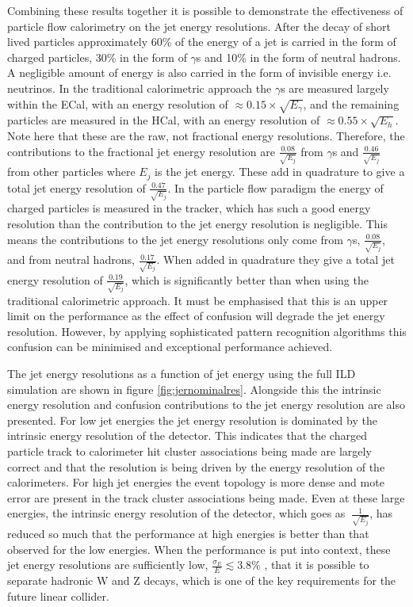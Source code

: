 Combining these results together it is possible to demonstrate the effectiveness of particle flow calorimetry on the jet energy resolutions.  After the decay of short lived particles approximately 60\% of the energy of a jet is carried in the form of charged particles, 30\% in the form of $\gamma$s and 10\% in the form of neutral hadrons.  A negligible amount of energy is also carried in the form of invisible energy i.e. neutrinos.  In the traditional calorimetric approach the $\gamma$s are measured largely within the ECal, with an energy resolution of $\approx 0.15 \times \sqrt{E_{\gamma}}$, and the remaining particles are measured in the HCal, with an energy resolution of $\approx 0.55 \times \sqrt{E_{h}}$.  Note here that these are the raw, not fractional energy resolutions.  Therefore, the contributions to the fractional jet energy resolution are $\frac{0.08}{\sqrt{E_{j}}}$ from $\gamma$s and $\frac{0.46}{\sqrt{E_{j}}}$ from other particles where $E_{j}$ is the jet energy.  These add in quadrature to give a total jet energy resolution of $\frac{0.47}{\sqrt{E_{j}}}$.  In the particle flow paradigm the energy of charged particles is measured in the tracker, which has such a good energy resolution than the contribution to the jet energy resolution is negligible.  This means the contributions to the jet energy resolutions only come from $\gamma$s, $\frac{0.08}{\sqrt{E_{j}}}$, and from neutral hadrons, $\frac{0.17}{\sqrt{E_{j}}}$.  When added in quadrature they give a total jet energy resolution of $\frac{0.19}{\sqrt{E_{j}}}$, which is significantly better than when using the traditional calorimetric approach.  It must be emphasised that this is an upper limit on the performance as the effect of confusion will degrade the jet energy resolution.  However, by applying sophisticated pattern recognition algorithms this confusion can be minimised and exceptional performance achieved. 

The jet energy resolutions as a function of jet energy using the full ILD simulation are shown in figure \ref{fig:jernominalres}.  Alongside this the intrinsic energy resolution and confusion contributions to the jet energy resolution are also presented.  For low jet energies the jet energy resolution is dominated by the intrinsic energy resolution of the detector.  This indicates that the charged particle track to calorimeter hit cluster associations being made are largely correct and that the resolution is being driven by the energy resolution of the calorimeters.  For high jet energies the event topology is more dense and mote error are present in the track cluster associations being made.  Even at these large energies, the intrinsic energy resolution of the detector, which goes as $~\frac{1}{\sqrt{E_{j}}}$, has reduced so much that the performance at high energies is better than that observed for the low energies.  When the performance is put into context, these jet energy resolutions are sufficiently low, $\frac{\sigma_{E}}{E} \lesssim 3.8\%$ \cite{Behnke:2013lya, arXiv:0907.3577, Linssen:2012hp}, that it is possible to separate hadronic W and Z decays, which is one of the key requirements for the future linear collider.    

